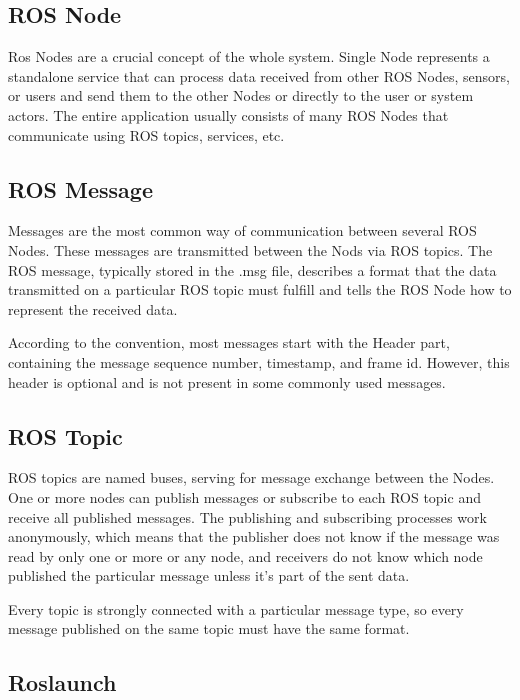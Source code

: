 \subsection*{ROS Node}

Ros Nodes are a crucial concept of the whole system. Single Node represents a standalone service that can process data received from other ROS Nodes, sensors, or users and send them to the other Nodes or directly to the user or system actors. The entire application usually consists of many ROS Nodes that communicate using ROS topics, services, etc.

\subsection*{ROS Message}

Messages are the most common way of communication between several ROS Nodes. These messages are transmitted between the Nods via ROS topics. The ROS message, typically stored in the .msg file, describes a format that the data transmitted on a particular ROS topic must fulfill and tells the ROS Node how to represent the received data.\par
According to the convention, most messages start with the Header part, containing the message sequence number, timestamp, and frame id. However, this header is optional and is not present in some commonly used messages.

\subsection*{ROS Topic}

ROS topics are named buses, serving for message exchange between the Nodes. One or more nodes can publish messages or subscribe to each ROS topic and receive all published messages. The publishing and subscribing processes work anonymously, which means that the publisher does not know if the message was read by only one or more or any node, and receivers do not know which node published the particular message unless it's part of the sent data.\par
Every topic is strongly connected with a particular message type, so every message published on the same topic must have the same format.

\subsection*{Roslaunch}

